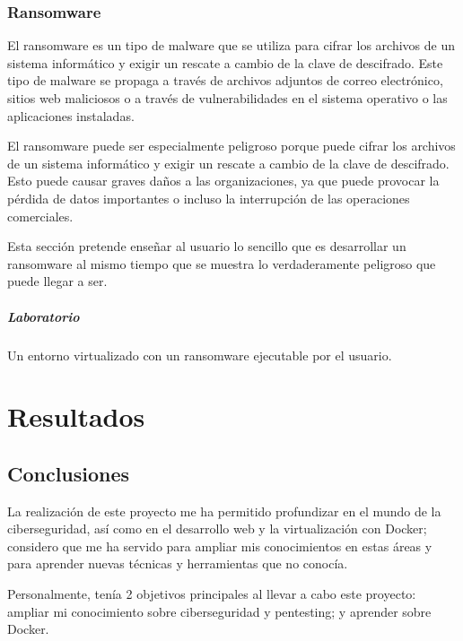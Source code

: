         \subsection{Ransomware}
        
            El ransomware es un tipo de malware que se utiliza para cifrar los archivos de un sistema informático y exigir un rescate a cambio de la clave de descifrado. Este tipo de malware se propaga a través de archivos adjuntos de correo electrónico, sitios web maliciosos o a través de vulnerabilidades en el sistema operativo o las aplicaciones instaladas.
            
            El ransomware puede ser especialmente peligroso porque puede cifrar los archivos de un sistema informático y exigir un rescate a cambio de la clave de descifrado. Esto puede causar graves daños a las organizaciones, ya que puede provocar la pérdida de datos importantes o incluso la interrupción de las operaciones comerciales.

            Esta sección pretende enseñar al usuario lo sencillo que es desarrollar un ransomware al mismo tiempo que se muestra lo verdaderamente peligroso que puede llegar a ser.
            
            \paragraph{Laboratorio}
            
                Un entorno virtualizado con un ransomware ejecutable por el usuario.
        
        \cleardoublepage



\chapter{Resultados}
    
    \section{Conclusiones}

        La realización de este proyecto me ha permitido profundizar en el mundo de la ciberseguridad, así como en el desarrollo web y la virtualización con Docker; considero que me ha servido para ampliar mis conocimientos en estas áreas y para aprender nuevas técnicas y herramientas que no conocía.
    
        Personalmente, tenía 2 objetivos principales al llevar a cabo este proyecto: ampliar mi conocimiento sobre ciberseguridad y pentesting; y aprender sobre Docker.

